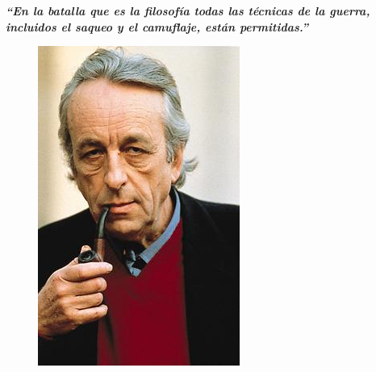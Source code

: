 \documentclass{article}
\begin{document}
\begin{multicols*}{3}
\textbf{\textit{``En la batalla que es la filosofía todas las técnicas de la guerra, incluidos el saqueo y el camuflaje, están permitidas.''}}

\begin{figure}[H]
	\centering	
    \includegraphics[width=.4\columnwidth]{Althusser}
\end{figure}

\closearticle
\end{multicols*}
\end{document}
